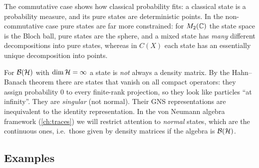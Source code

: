\begin{center}
\renewcommand{\arraystretch}{1.3}
\end{center}

The commutative case shows how classical probability fits: a classical state is a probability measure, and its pure states are deterministic points. In the non-commutative case pure states are far more constrained: for $M_2(\mathbb{C})$ the state space is the Bloch ball, pure states are the sphere, and a mixed state has \emph{many} different decompositions into pure states, whereas in $C(X)$ each state has an essentially unique decomposition into points.

\begin{whatwrong}
For $\mathcal{B}(\mathcal{H})$ with $\dim\mathcal{H}=\infty$ a state is \emph{not} always a density matrix. By the Hahn--Banach theorem there are states that vanish on all compact operators: they assign probability $0$ to every finite-rank projection, so they look like particles ``at infinity''. They are \emph{singular} (not normal). Their GNS representations are inequivalent to the identity representation. In the von Neumann algebra framework (\cref{ch:traces}) we will restrict attention to \emph{normal} states, which are the continuous ones, i.e.\ those given by density matrices if the algebra is $\mathcal{B}(\mathcal{H})$.
\end{whatwrong}

\subsection{Examples}

